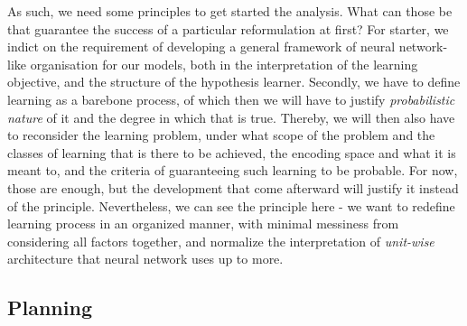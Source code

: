 As such, we need some principles to get started the analysis. What can those be that guarantee the success of a particular reformulation at first? For starter, we indict on the requirement of developing a general framework of neural network-like organisation for our models, both in the interpretation of the learning objective, and the structure of the hypothesis learner. Secondly, we have to define learning as a barebone process, of which then we will have to justify \textit{probabilistic nature} of it and the degree in which that is true. Thereby, we will then also have to reconsider the learning problem, under what scope of the problem and the classes of learning that is there to be achieved, the encoding space and what it is meant to, and the criteria of guaranteeing such learning to be probable. For now, those are enough, but the development that come afterward will justify it instead of the principle. 
Nevertheless, we can see the principle here - we want to redefine learning process in an organized manner, with minimal messiness from considering all factors together, and normalize the interpretation of \textit{unit-wise} architecture that neural network uses up to more. 

\subsection{Planning}

